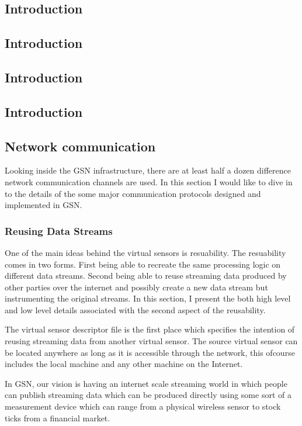 \subsection{Introduction}
\subsection{Introduction}
\subsection{Introduction}
\subsection{Introduction}
\subsection{Network communication}
Looking inside the GSN infrastructure, there are at least half a dozen difference network communication channels are used. In this section I would like to dive in to the details
of the some major communication protocols designed and implemented in GSN. 

\subsubsection{Reusing Data Streams}

One of the main ideas behind the virtual sensors is resuability. The resuability comes in two forms.
First being able to recreate the same processing logic on different data streams.
Second being able to reuse streaming data produced by other parties over the internet and possibly create a new data stream but instrumenting the original streams.
In this section, I present the both high level and low level details associated with the second aspect of the reusability.

The virtual sensor descriptor file is the first place which specifies the intention of reusing streaming data from another virtual sensor. The source virtual sensor can be located
anywhere as long as it is accessible through the network, this ofcourse includes the local machine and any other machine on the Internet. 


In GSN, our vision is having an internet scale streaming world in which people can publish streaming data which
can be produced directly using some sort of a measurement device which can range from a physical wireless sensor to stock ticks from a financial market.

